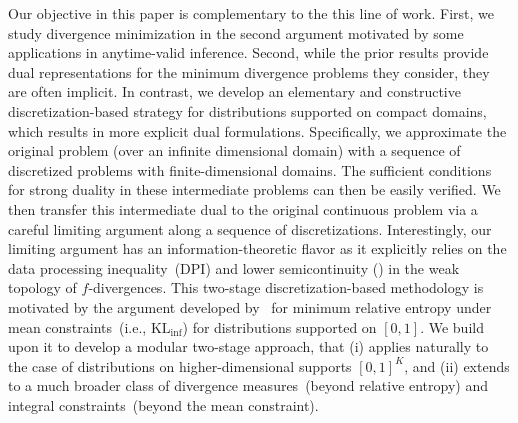 \documentclass{article}
\theoremstyle{plain}
\theoremstyle{definition}
\newcommand{\KLinf}{\operatorname{KL_{inf}}}
\newcommand{\lsc}{\text{lsc}\xspace}
\begin{document}
Our objective in this paper is complementary to the this line of work. First, we study  divergence minimization in the second argument motivated by some applications in anytime-valid inference. 
Second, while the prior results provide dual representations for the minimum divergence problems they consider, they are often implicit. In contrast, 
we develop an elementary and constructive discretization-based strategy for distributions supported on compact domains, which results in more explicit dual formulations. Specifically, we  approximate the original problem (over an infinite dimensional domain) with a sequence of discretized problems with finite-dimensional domains. The sufficient conditions  for strong duality in these intermediate problems can then be easily verified. We then transfer this intermediate dual to the original continuous problem via a careful limiting argument along a sequence of discretizations. Interestingly, our limiting argument has an information-theoretic flavor as it explicitly relies on  the data processing inequality~(DPI) and lower semicontinuity (\lsc)
in the weak topology of $f$-divergences. 
This two-stage discretization-based methodology is motivated by the argument developed by~\citet{honda2010asymptotically} for minimum relative entropy under mean constraints~(i.e., $\KLinf$) for distributions supported on $[0,1]$. 
We build upon it to develop a modular two-stage approach,  that (i) applies naturally to the case of distributions on higher-dimensional supports $[0,1]^K$, and (ii) extends to a much broader class of divergence measures~(beyond relative entropy) and integral constraints~(beyond the mean constraint). 
\end{document}
